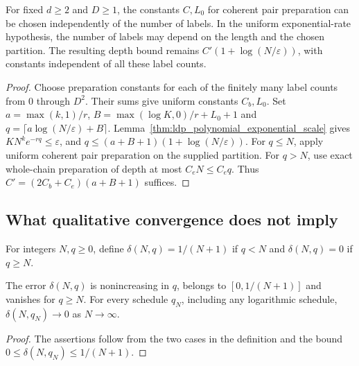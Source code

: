 \begin{lemma}
    \label{lem:ldp_coherent_pair_varying_labels}
    \leanok
    For fixed $d\ge2$ and $D\ge1$, the constants $C,L_0$ for coherent
    pair preparation can be chosen independently of the number of
    labels. In the uniform exponential-rate hypothesis, the number
    of labels may depend on the length and the chosen partition.
    The resulting depth bound remains $C'(1+\log(N/\varepsilon))$,
    with constants independent of all these label counts.
\end{lemma}
\begin{proof}\leanok
    Choose preparation constants for each of the finitely many label
    counts from $0$ through $D^2$. Their sums give uniform constants
    $C_b,L_0$. Set $a=\max(k,1)/r$,
    $B=\max(\log K,0)/r+L_0+1$ and
    $q=\lceil a\log(N/\varepsilon)+B\rceil$.
    Lemma~\ref{thm:ldp_polynomial_exponential_scale} gives
    $KN^ke^{-rq}\le\varepsilon$, and
    $q\le(a+B+1)(1+\log(N/\varepsilon))$.
    For $q\le N$, apply uniform coherent pair preparation on the supplied
    partition. For $q>N$, use exact whole-chain preparation of depth at
    most $C_eN\le C_eq$. Thus $C'=(2C_b+C_e)(a+B+1)$ suffices.
\end{proof}

\subsection{What qualitative convergence does not imply}

\begin{definition}
    \label{def:ldp_delayed_blocking_error}
    \leanok
    For integers $N,q\ge0$, define $\delta(N,q)=1/(N+1)$ if $q<N$ and
    $\delta(N,q)=0$ if $q\ge N$.
\end{definition}

\begin{lemma}
    \label{lem:ldp_delayed_blocking_convergence}
    \leanok
    The error $\delta(N,q)$ is nonincreasing in $q$, belongs to
    $[0,1/(N+1)]$ and vanishes for $q\ge N$. For every schedule $q_N$,
    including any logarithmic schedule, $\delta(N,q_N)\to0$ as $N\to\infty$.
\end{lemma}
\begin{proof}\leanok
    The assertions follow from the two cases in the definition and the
    bound $0\le\delta(N,q_N)\le1/(N+1)$.
\end{proof}

